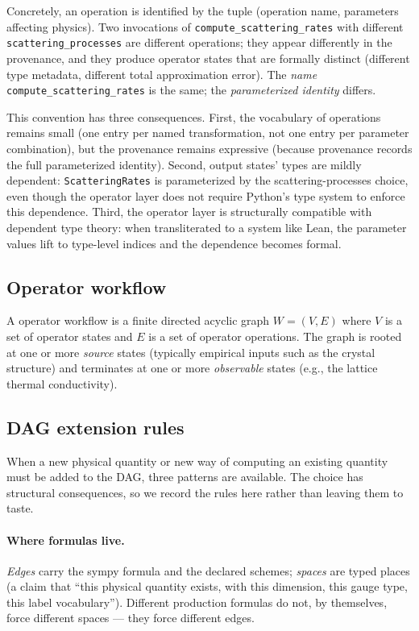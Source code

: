 \documentclass[11pt,a4paper]{article}
\begin{document}
Concretely, an operation is identified by the tuple (operation name, parameters affecting
physics). Two invocations of \texttt{compute\_scattering\_rates} with different
\texttt{scattering\_processes} are different operations; they appear differently in the
provenance, and they produce operator states that are formally distinct (different type metadata,
different total approximation error). The \emph{name} \texttt{compute\_scattering\_rates} is the
same; the \emph{parameterized identity} differs.

This convention has three consequences. First, the vocabulary of operations remains small (one
entry per named transformation, not one entry per parameter combination), but the provenance
remains expressive (because provenance records the full parameterized identity). Second, output
states' types are mildly dependent: \texttt{ScatteringRates} is parameterized by the
scattering-processes choice, even though the operator layer does not require Python's type system to
enforce this dependence. Third, the operator layer is structurally compatible with dependent type
theory: when transliterated to a system like Lean, the parameter values lift to type-level
indices and the dependence becomes formal.


\subsection{Operator workflow}

A operator workflow is a finite directed acyclic graph $W = (V, E)$ where $V$ is a set of
operator states and $E$ is a set of operator operations. The graph is rooted at one or more
\emph{source} states (typically empirical inputs such as the crystal structure) and terminates
at one or more \emph{observable} states (e.g., the lattice thermal conductivity).

\subsection{DAG extension rules}
\label{ssec:dag-extension-rules}

When a new physical quantity or new way of computing an existing quantity must be
added to the DAG, three patterns are available. The choice has structural
consequences, so we record the rules here rather than leaving them to taste.

\paragraph{Where formulas live.} \emph{Edges} carry the sympy formula and the
declared schemes; \emph{spaces} are typed places (a claim that ``this physical
quantity exists, with this dimension, this gauge type, this label
vocabulary''). Different production formulas do not, by themselves, force
different spaces --- they force different edges.
\end{document}
